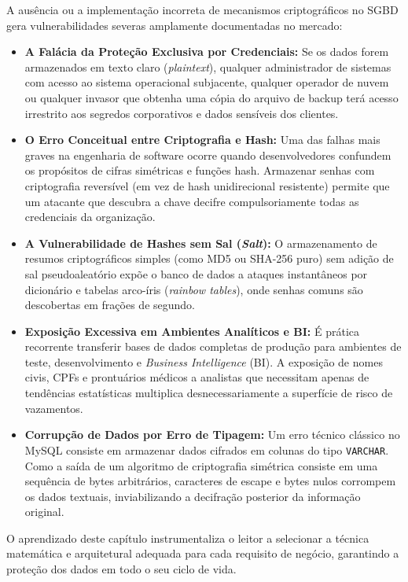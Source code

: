 A ausência ou a implementação incorreta de mecanismos criptográficos no SGBD gera vulnerabilidades severas amplamente documentadas no mercado:
\begin{itemize}
    \item \textbf{A Falácia da Proteção Exclusiva por Credenciais:} Se os dados forem armazenados em texto claro (\textit{plaintext}), qualquer administrador de sistemas com acesso ao sistema operacional subjacente, qualquer operador de nuvem ou qualquer invasor que obtenha uma cópia do arquivo de backup terá acesso irrestrito aos segredos corporativos e dados sensíveis dos clientes.
    \item \textbf{O Erro Conceitual entre Criptografia e Hash:} Uma das falhas mais graves na engenharia de software ocorre quando desenvolvedores confundem os propósitos de cifras simétricas e funções hash. Armazenar senhas com criptografia reversível (em vez de hash unidirecional resistente) permite que um atacante que descubra a chave decifre compulsoriamente todas as credenciais da organização.
    \item \textbf{A Vulnerabilidade de Hashes sem Sal (\textit{Salt}):} O armazenamento de resumos criptográficos simples (como MD5 ou SHA-256 puro) sem adição de sal pseudoaleatório expõe o banco de dados a ataques instantâneos por dicionário e tabelas arco-íris (\textit{rainbow tables}), onde senhas comuns são descobertas em frações de segundo.
    \item \textbf{Exposição Excessiva em Ambientes Analíticos e BI:} É prática recorrente transferir bases de dados completas de produção para ambientes de teste, desenvolvimento e \textit{Business Intelligence} (BI). A exposição de nomes civis, CPFs e prontuários médicos a analistas que necessitam apenas de tendências estatísticas multiplica desnecessariamente a superfície de risco de vazamentos.
    \item \textbf{Corrupção de Dados por Erro de Tipagem:} Um erro técnico clássico no MySQL consiste em armazenar dados cifrados em colunas do tipo \texttt{VARCHAR}. Como a saída de um algoritmo de criptografia simétrica consiste em uma sequência de bytes arbitrários, caracteres de escape e bytes nulos corrompem os dados textuais, inviabilizando a decifração posterior da informação original.
\end{itemize}

O aprendizado deste capítulo instrumentaliza o leitor a selecionar a técnica matemática e arquitetural adequada para cada requisito de negócio, garantindo a proteção dos dados em todo o seu ciclo de vida.

